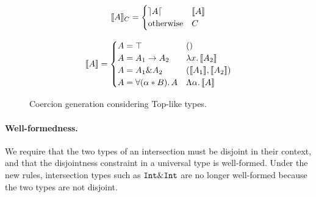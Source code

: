 \begin{figure}[t]


  \begin{center}
  \end{center}

  \[
  \llbracket A \rrbracket_{C} = 
  \begin{cases} 
        \rceil A \lceil & \llbracket A \rrbracket \\ 
        \text{otherwise} & {C} 
  \end{cases}
  \]

  \begin{center}
  \end{center}

  \[
  \llbracket A \rrbracket = 
  \begin{cases} 
        A = \top & () \\
        A = A_1 \to A_2 & \lambda x.\, \llbracket A_2 \rrbracket \\
        A = A_1 \& A_2 & (\llbracket A_1 \rrbracket, \llbracket A_2 \rrbracket) \\
        A = \forall (\alpha * B).\, A & \Lambda \alpha.\, \llbracket A \rrbracket
  \end{cases}
  \]
  \caption{Coercion generation considering Top-like types.}
  \label{fig:andcoercion}
\end{figure}




\paragraph{Well-formedness.}
We require that the two types of an intersection must be disjoint in their
context, and that the disjointness constraint in a universal type is well-formed.
Under the new rules, intersection types such as $\texttt{Int} \& \texttt{Int}$ are no
longer well-formed because the two types are not disjoint.

